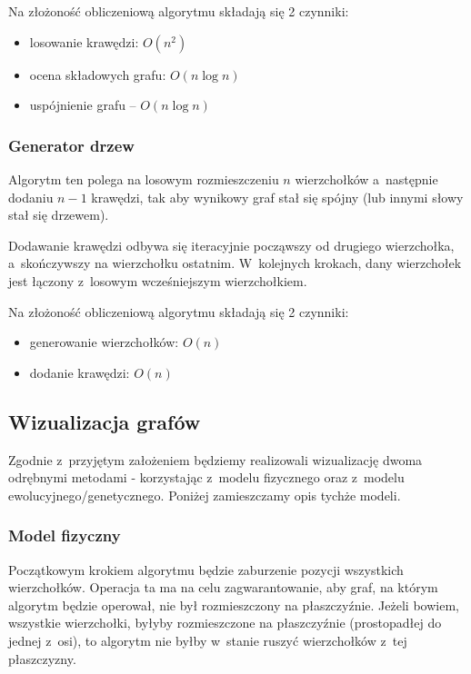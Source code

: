 \documentclass[a4paper,onecolumn,oneside,12pt]{mwart}
\begin{document}
Na złożoność obliczeniową algorytmu składają się 2 czynniki:
\begin{itemize}
	\item losowanie krawędzi: $O(n^2)$
	\item ocena składowych grafu: $O(n\log{n})$
	\item uspójnienie grafu -- $O(n\log{n})$
\end{itemize}

\subsubsection{Generator drzew}

Algorytm ten polega na losowym rozmieszczeniu $n$ wierzchołków a~następnie
dodaniu $n-1$ krawędzi, tak aby wynikowy graf stał się spójny (lub innymi
słowy stał się drzewem).

Dodawanie krawędzi odbywa się iteracyjnie począwszy od drugiego
wierzchołka, a~skończywszy na wierzchołku ostatnim.  W~kolejnych krokach,
dany wierzchołek jest łączony z~losowym wcześniejszym wierzchołkiem.

Na złożoność obliczeniową algorytmu składają się 2 czynniki:
\begin{itemize}
	\item generowanie wierzchołków: $O(n)$
	\item dodanie krawędzi: $O(n)$
\end{itemize}

\subsection{Wizualizacja grafów}

Zgodnie z~przyjętym założeniem będziemy realizowali wizualizację dwoma
odrębnymi metodami - korzystając z~modelu fizycznego oraz z~modelu
ewolucyjnego/genetycznego. Poniżej zamieszczamy opis tychże modeli.

\subsubsection{Model fizyczny}

Początkowym krokiem algorytmu będzie zaburzenie pozycji wszystkich
wierzchołków.  Operacja ta ma na celu zagwarantowanie, aby graf, na którym
algorytm będzie operował, nie był rozmieszczony na płaszczyźnie.  Jeżeli
bowiem, wszystkie wierzchołki, byłyby rozmieszczone na płaszczyźnie
(prostopadłej do jednej z~osi), to algorytm nie byłby w~stanie ruszyć
wierzchołków z~tej płaszczyzny.
\end{document}
